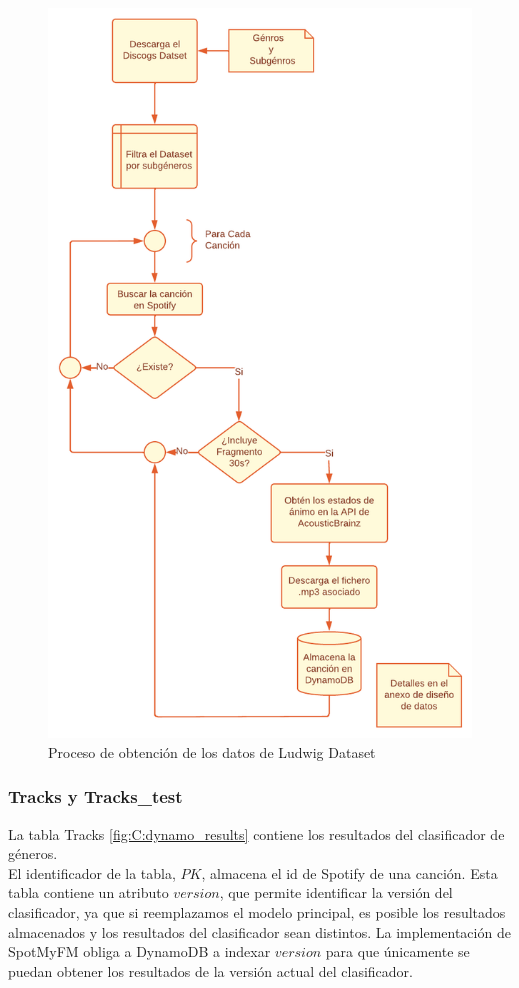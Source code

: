 \begin{figure}
    \centering
    \includegraphics[width=12cm]{img/5/ludwig_dataset.png}
    \caption{Proceso de obtención de los datos de Ludwig Dataset}
    \label{fig:ludwig_dataset}
\end{figure}

\subsubsection{Tracks y Tracks\_test}
La tabla Tracks \ref{fig:C:dynamo_results} contiene los resultados del clasificador de géneros. \\
El identificador de la tabla, $PK$, almacena el id de Spotify de una canción. Esta tabla contiene un atributo $version$, que permite identificar la versión del clasificador, ya que si reemplazamos el modelo principal, es posible los resultados almacenados y los resultados del clasificador sean distintos.
La implementación de SpotMyFM obliga a DynamoDB a indexar $version$ para que únicamente se puedan obtener los resultados de la versión actual del clasificador.

